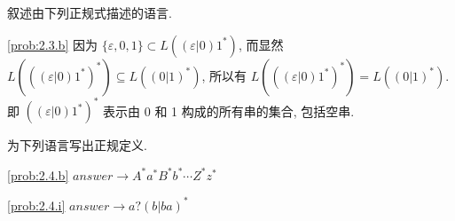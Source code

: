 \documentclass[boxes]{homework}
\begin{document}
\begin{problem}
叙述由下列正规式描述的语言.
\end{problem}
\begin{solution}
    \ref{prob:2.3.b}
    因为 $\{\varepsilon, 0, 1\}\subset L((\varepsilon|0)1^{*})$, 而显然
    $L({((\varepsilon|0)1^{*})}^{*}) \subseteq L({(0 | 1)}^{*})$, 所以有
    $L({((\varepsilon|0)1^{*})}^{*}) = L({(0 | 1)}^{*})$. 即 ${((\varepsilon |
                0)1^{*})}^{*}$ 表示由 0 和 1 构成的所有串的集合, 包括空串.
\end{solution}

\begin{problem}
为下列语言写出正规定义.
\end{problem}
\begin{solution}
    \ref{prob:2.4.b}
    $answer\to A^{*}a^{*}B^{*}b^{*}\cdots Z^{*}z^{*}$

    \ref{prob:2.4.i}
    $answer\to a?{\left( b | ba\right)}^{*}$

\end{solution}
\end{document}
